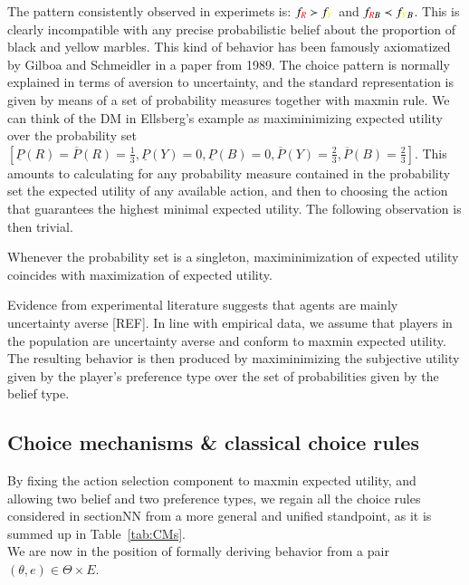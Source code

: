 \documentclass[fleqn,reqno,11pt]{article}
\begin{document}
The pattern consistently observed in experimets is: $f_{{\color{red}R}} \succ f_{{\color{yellow}Y}}$ and $f_{{\color{red}R}B} \prec f_{{\color{yellow}Y}B}$. This is clearly incompatible with any precise probabilistic belief about the proportion of black and yellow marbles. This kind of behavior has been
famously axiomatized by Gilboa and Schmeidler in a paper from 1989. The choice pattern is normally explained in terms of aversion to uncertainty, and the standard representation is given by means of a set of probability measures together with maxmin rule. We can think of the DM in Ellsberg's example as maximinimizing expected utility over the probability set $ [\underline{P}(R)=\overline{P}(R)=\frac{1}{3},\underline{P}(Y)=0,\underline{P}(B)=0,\overline{P}(Y)=\frac{2}{3},\overline{P}(B)=\frac{2}{3}]  $. This amounts to calculating for any probability measure contained in the probability set the expected utility of any available action, and then to choosing the action that guarantees the highest minimal expected utility. The following observation is then trivial.

\begin{fact} \label{fact:singleton probability set}
Whenever the probability set is a singleton, maximinimization of
expected utility coincides with maximization of expected utility.
\end{fact}

Evidence from experimental literature suggests that agents are mainly uncertainty
averse [REF]. In line with empirical data,
we assume that players in the population are uncertainty averse and conform to maxmin expected
utility. The resulting behavior is then produced by maximinimizing the subjective utility
given by the player's preference type over the set of probabilities given by the belief type.



\subsection{Choice mechanisms \& classical choice rules}

By fixing the action selection component to maxmin expected utility, and allowing two belief and
two preference types, we regain all the choice rules considered in sectionNN from a more general and unified standpoint, as it is summed up in
Table~\ref{tab:CMs}. \\
We are now in the position of formally deriving behavior from a pair $(\theta, e) \in \Theta \times E$.
\end{document}
